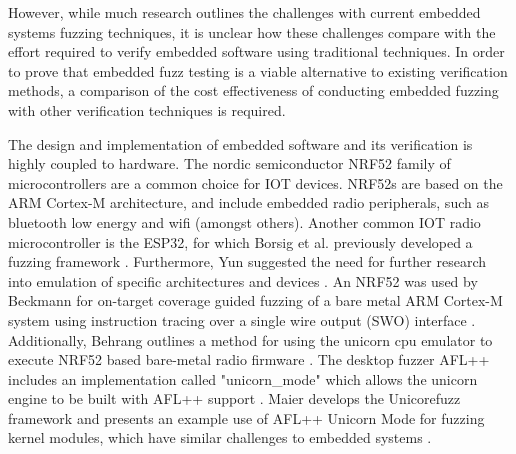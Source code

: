 \documentclass[../report.tex]{subfiles}
\begin{document}




However, while much research outlines the
challenges with current embedded systems fuzzing techniques, it is unclear how
these challenges compare with the effort required to verify embedded software
using traditional techniques. In order to prove that embedded fuzz testing is a
viable alternative to existing verification methods, a comparison of the cost
effectiveness of conducting embedded fuzzing with other verification techniques
is required.

The design and implementation of embedded software and its verification is
highly coupled to hardware. The nordic semiconductor NRF52 family of
microcontrollers are a common choice for IOT devices. NRF52s are based on the
ARM Cortex-M architecture, and include embedded radio peripherals, such as
bluetooth low energy and wifi (amongst others). Another common IOT radio
microcontroller is the ESP32, for which Borsig et al. previously developed a
fuzzing framework \citep{Borsig_2020}. Furthermore, Yun suggested the need for
further research into emulation of specific architectures and devices
\citep{Yun_2022}. An NRF52 was used by Beckmann for on-target coverage guided
fuzzing of a bare metal ARM Cortex-M system using instruction tracing over a
single wire output (SWO) interface \citep{Beckmann_2023}. Additionally, Behrang
outlines a method for using the unicorn cpu emulator to execute NRF52 based
bare-metal radio firmware \citep{Behrang_2023}. The desktop fuzzer AFL++
includes an implementation called "unicorn\_mode" which allows the unicorn
engine to be built with AFL++ support \citep{UnicornMode}. Maier develops the
Unicorefuzz framework and presents an example use of AFL++ Unicorn Mode for
fuzzing kernel modules, which have similar challenges to embedded systems
\citep{Maier_2019}.
\end{document}
